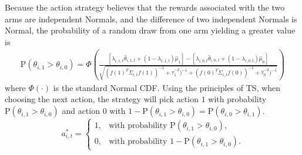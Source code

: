 \documentclass[letterpaper, 9pt]{extarticle}
\begin{document}
Because the action strategy believes that the rewards associated with the two arms are independent Normals, and the difference of two independent Normals is Normal, the probability of a random draw from one arm yielding a greater value is
\begin{align*}
\textrm{P}(\theta_{i,1}>\theta_{i,0})
=
\Phi\!\left(
\frac{
[\lambda_{i,1,t}\hat{\theta}_{i,1,t}+(1-\lambda_{i,1,t})\hat{\mu}_{1}]
-
[\lambda_{i,0,t}\hat{\theta}_{i,0,t}+(1-\lambda_{i,0,t})\hat{\mu}_{0}]
}{
\sqrt{
(f(1)^T \Sigma_{i,t}f(1))^{-1}+\hat{\tau}_{1}^{-2})^{-1}
+
(f(0)^T \Sigma_{i,t}f(0))^{-1}+\hat{\tau}_{0}^{-2})^{-1}
}}
\right)
\end{align*}
where $\Phi(\cdot)$ is the standard Normal CDF. Using the principles of TS, when choosing the next action, the strategy will pick action $1$ with probability $\textrm{P}(\theta_{i,1}>\theta_{i,0})$ and action $0$ with $1-\textrm{P}(\theta_{i,1}>\theta_{i,0})=\textrm{P}(\theta_{i,0}>\theta_{i,1})$.
\[
a^*_{i,t} =
\begin{cases}
1, & \text{with probability } \textrm{P}(\theta_{i,1}>\theta_{i,0}),\\
0, & \text{with probability } 1-\textrm{P}(\theta_{i,1}>\theta_{i,0}).
\end{cases}
\]
\end{document}
